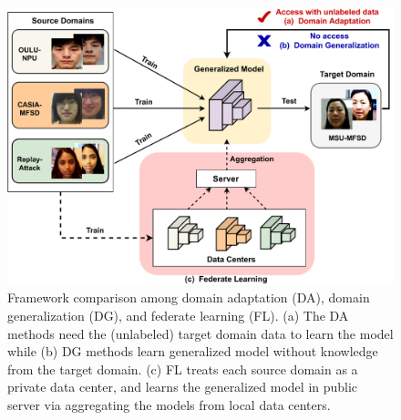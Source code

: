 \documentclass[10pt,journal,compsoc]{IEEEtran}
\begin{document}
\begin{figure}
\centering
\includegraphics[scale=0.4]{Figures/domain.pdf}
  \caption{ 
   Framework comparison among domain adaptation (DA), domain generalization (DG), and federate learning (FL). (a) The DA methods
need the (unlabeled) target domain data to learn the model while (b) DG methods learn generalized model without knowledge from the target domain. (c) FL treats each source domain as a private data center, and learns the generalized model in public server via aggregating the models from local data centers.
  }
\label{fig:domain}
\end{figure}
\end{document}
